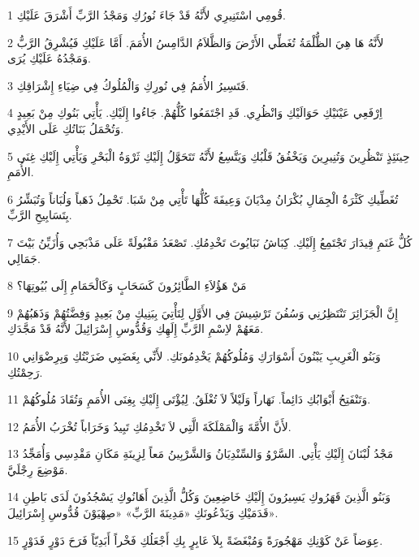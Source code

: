 \par 1 قُومِي اسْتَنِيرِي لأَنَّهُ قَدْ جَاءَ نُورُكِ وَمَجْدُ الرَّبِّ أَشْرَقَ عَلَيْكِ.
\par 2 لأَنَّهُ هَا هِيَ الظُّلْمَةُ تُغَطِّي الأَرْضَ وَالظَّلاَمُ الدَّامِسُ الأُمَمَ. أَمَّا عَلَيْكِ فَيُشْرِقُ الرَّبُّ وَمَجْدُهُ عَلَيْكِ يُرَى.
\par 3 فَتَسِيرُ الأُمَمُ فِي نُورِكِ وَالْمُلُوكُ فِي ضِيَاءِ إِشْرَاقِكِ.
\par 4 اِرْفَعِي عَيْنَيْكِ حَوَالَيْكِ وَانْظُرِي. قَدِ اجْتَمَعُوا كُلُّهُمْ. جَاءُوا إِلَيْكِ. يَأْتِي بَنُوكِ مِنْ بَعِيدٍ وَتُحْمَلُ بَنَاتُكِ عَلَى الأَيْدِي.
\par 5 حِينَئِذٍ تَنْظُرِينَ وَتُنِيرِينَ وَيَخْفُقُ قَلْبُكِ وَيَتَّسِعُ لأَنَّهُ تَتَحَوَّلُ إِلَيْكِ ثَرْوَةُ الْبَحْرِ وَيَأْتِي إِلَيْكِ غِنَى الأُمَمِ.
\par 6 تُغَطِّيكِ كَثْرَةُ الْجِمَالِ بُكْرَانُ مِدْيَانَ وَعِيفَةَ كُلُّهَا تَأْتِي مِنْ شَبَا. تَحْمِلُ ذَهَباً وَلُبَاناً وَتُبَشِّرُ بِتَسَابِيحِ الرَّبِّ.
\par 7 كُلُّ غَنَمِ قِيدَارَ تَجْتَمِعُ إِلَيْكِ. كِبَاشُ نَبَايُوتَ تَخْدِمُكِ. تَصْعَدُ مَقْبُولَةً عَلَى مَذْبَحِي وَأُزَيِّنُ بَيْتَ جَمَالِي.
\par 8 مَنْ هَؤُلاَءِ الطَّائِرُونَ كَسَحَابٍ وَكَالْحَمَامِ إِلَى بُيُوتِهَا؟
\par 9 إِنَّ الْجَزَائِرَ تَنْتَظِرُنِي وَسُفُنَ تَرْشِيشَ فِي الأَوَّلِ لِتَأْتِيَ بِبَنِيكِ مِنْ بَعِيدٍ وَفِضَّتُهُمْ وَذَهَبُهُمْ مَعَهُمْ لاِسْمِ الرَّبِّ إِلَهِكِ وَقُدُّوسِ إِسْرَائِيلَ لأَنَّهُ قَدْ مَجَّدَكِ.
\par 10 وَبَنُو الْغَرِيبِ يَبْنُونَ أَسْوَارَكِ وَمُلُوكُهُمْ يَخْدِمُونَكِ. لأَنِّي بِغَضَبِي ضَرَبْتُكِ وَبِرِضْوَانِي رَحِمْتُكِ.
\par 11 وَتَنْفَتِحُ أَبْوَابُكِ دَائِماً. نَهَاراً وَلَيْلاً لاَ تُغْلَقُ. لِيُؤْتَى إِلَيْكِ بِغِنَى الأُمَمِ وَتُقَادَ مُلُوكُهُمْ.
\par 12 لأَنَّ الأُمَّةَ وَالْمَمْلَكَةَ الَّتِي لاَ تَخْدِمُكِ تَبِيدُ وَخَرَاباً تُخْرَبُ الأُمَمُ.
\par 13 مَجْدُ لُبْنَانَ إِلَيْكِ يَأْتِي. السَّرْوُ وَالسِّنْدِيَانُ وَالشَّرْبِينُ مَعاً لِزِينَةِ مَكَانِ مَقْدِسِي وَأُمَجِّدُ مَوْضِعَ رِجْلَيَّ.
\par 14 وَبَنُو الَّذِينَ قَهَرُوكِ يَسِيرُونَ إِلَيْكِ خَاضِعِينَ وَكُلُّ الَّذِينَ أَهَانُوكِ يَسْجُدُونَ لَدَى بَاطِنِ قَدَمَيْكِ وَيَدْعُونَكِ «مَدِينَةَ الرَّبِّ» «صِهْيَوْنَ قُدُّوسِ إِسْرَائِيلَ».
\par 15 عِوَضاً عَنْ كَوْنِكِ مَهْجُورَةً وَمُبْغَضَةً بِلاَ عَابِرٍ بِكِ أَجْعَلُكِ فَخْراً أَبَدِيّاً فَرَحَ دَوْرٍ فَدَوْرٍ.
